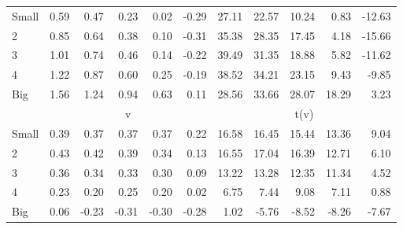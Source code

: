 \begin{table}[!ht]
\begin{tabular}{lrrrrrrrrrr}
    \\
      \cmidrule(r){2-6} \cmidrule(r){7-11}

    Small   & 0.59  & 0.47  & 0.23  & 0.02  & -0.29  & 27.11  & 22.57  & 10.24  & 0.83  & -12.63  \\
         2  & 0.85  & 0.64  & 0.38  & 0.10  & -0.31  & 35.38  & 28.35  & 17.45  & 4.18  & -15.66  \\
         3  & 1.01  & 0.74  & 0.46  & 0.14  & -0.22  & 39.49  & 31.35  & 18.88  & 5.82  & -11.62  \\
         4  & 1.22  & 0.87  & 0.60  & 0.25  & -0.19  & 38.52  & 34.21  & 23.15  & 9.43  & -9.85  \\
    Big     & 1.56  & 1.24  & 0.94  & 0.63  & 0.11  & 28.56  & 33.66  & 28.07  & 18.29  & 3.23  \\

  
    
      & \multicolumn{5}{c}{v} & \multicolumn{5}{c}{t(v)}
    
    \\
      \cmidrule(r){2-6} \cmidrule(r){7-11}

    Small   & 0.39  & 0.37  & 0.37  & 0.37  & 0.22  & 16.58  & 16.45  & 15.44  & 13.36  & 9.04  \\
         2  & 0.43  & 0.42  & 0.39  & 0.34  & 0.13  & 16.55  & 17.04  & 16.39  & 12.71  & 6.10  \\
         3  & 0.36  & 0.34  & 0.33  & 0.30  & 0.09  & 13.22  & 13.28  & 12.35  & 11.34  & 4.52  \\
         4  & 0.23  & 0.20  & 0.25  & 0.20  & 0.02  & 6.75  & 7.44  & 9.08  & 7.11  & 0.88  \\
    Big     & 0.06  & -0.23  & -0.31  & -0.30  & -0.28  & 1.02  & -5.76  & -8.52  & -8.26  & -7.67  \\

  

  \bottomrule
\end{tabular}
\label{tbl:25_Size_Var_FF1993}
\end{table}
